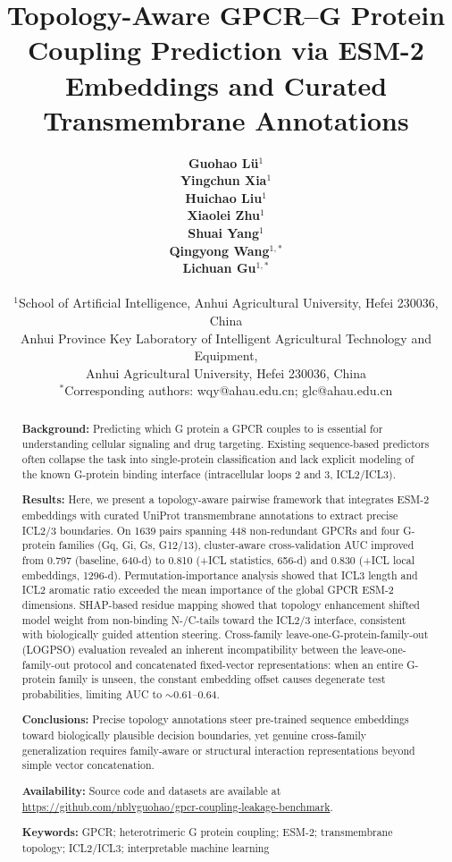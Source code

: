\documentclass[11pt,a4paper]{article}
\title{\textbf{Topology-Aware GPCR--G Protein Coupling Prediction via ESM-2 Embeddings and Curated Transmembrane Annotations}}
\author{
    \textbf{Guohao L\"{u}}$^{1}$ \\
    \textbf{Yingchun Xia}$^{1}$ \\
    \textbf{Huichao Liu}$^{1}$ \\
    \textbf{Xiaolei Zhu}$^{1}$ \\
    \textbf{Shuai Yang}$^{1}$ \\
    \textbf{Qingyong Wang}$^{1,*}$ \\
    \textbf{Lichuan Gu}$^{1,*}$ \\
    \\
    $^1$School of Artificial Intelligence, Anhui Agricultural University, Hefei 230036, China \\
    \quad Anhui Province Key Laboratory of Intelligent Agricultural Technology and Equipment, \\
    \quad Anhui Agricultural University, Hefei 230036, China \\
    $^*$Corresponding authors: wqy@ahau.edu.cn; glc@ahau.edu.cn
}
\date{}
\begin{document}
\maketitle

\thispagestyle{empty}

\begin{abstract}
\noindent\textbf{Background:} Predicting which G protein a GPCR couples to is essential for understanding cellular signaling and drug targeting. Existing sequence-based predictors often collapse the task into single-protein classification and lack explicit modeling of the known G-protein binding interface (intracellular loops 2 and 3, ICL2/ICL3).

\noindent\textbf{Results:} Here, we present a topology-aware pairwise framework that integrates ESM-2 embeddings with curated UniProt transmembrane annotations to extract precise ICL2/3 boundaries. On \num{1639} pairs spanning 448 non-redundant GPCRs and four G-protein families (Gq, Gi, Gs, G12/13), cluster-aware cross-validation AUC improved from 0.797 (baseline, 640-d) to 0.810 (+ICL statistics, 656-d) and 0.830 (+ICL local embeddings, 1296-d). Permutation-importance analysis showed that ICL3 length and ICL2 aromatic ratio exceeded the mean importance of the global GPCR ESM-2 dimensions. SHAP-based residue mapping showed that topology enhancement shifted model weight from non-binding N-/C-tails toward the ICL2/3 interface, consistent with biologically guided attention steering. Cross-family leave-one-G-protein-family-out (LOGPSO) evaluation revealed an inherent incompatibility between the leave-one-family-out protocol and concatenated fixed-vector representations: when an entire G-protein family is unseen, the constant embedding offset causes degenerate test probabilities, limiting AUC to $\sim$0.61--0.64.

\noindent\textbf{Conclusions:} Precise topology annotations steer pre-trained sequence embeddings toward biologically plausible decision boundaries, yet genuine cross-family generalization requires family-aware or structural interaction representations beyond simple vector concatenation.

\vspace{0.3cm}
\noindent\textbf{Availability:} Source code and datasets are available at \url{https://github.com/nblvguohao/gpcr-coupling-leakage-benchmark}.

\vspace{0.3cm}
\noindent\textbf{Keywords:} GPCR; heterotrimeric G protein coupling; ESM-2; transmembrane topology; ICL2/ICL3; interpretable machine learning
\end{abstract}
\end{document}
